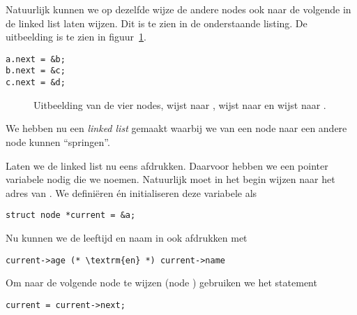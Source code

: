 Natuurlijk kunnen we op dezelfde wijze de andere nodes ook naar de volgende in de linked list laten wijzen. Dit is te zien in de onderstaande listing. De uitbeelding is te zien in figuur~\ref{fig:strstr4}.

\begin{lstlisting}[style=lstoneline]
a.next = &b;
b.next = &c;
c.next = &d;
\end{lstlisting}

\begin{figure}[!ht]
\centering
{}
\caption{Uitbeelding van de vier nodes,  wijst naar ,  wijst naar  en  wijst naar .}
\label{fig:strstr4}
\end{figure}

We hebben nu een \textsl{linked list} gemaakt waarbij we van een node naar een andere node kunnen ``springen''.

Laten we de linked list nu eens afdrukken. Daarvoor hebben we een pointer variabele nodig die we  noemen. Natuurlijk moet  in het begin wijzen naar het adres van . We definiëren én initialiseren deze variabele als

\begin{lstlisting}[style=lstoneline]
struct node *current = &a;
\end{lstlisting}

Nu kunnen we de leeftijd en naam in  ook afdrukken met

\begin{lstlisting}[style=lstoneline]
current->age (* \textrm{en} *) current->name
\end{lstlisting}

Om naar de volgende node te wijzen (node ) gebruiken we het statement

\begin{lstlisting}[style=lstoneline]
current = current->next;
\end{lstlisting}

